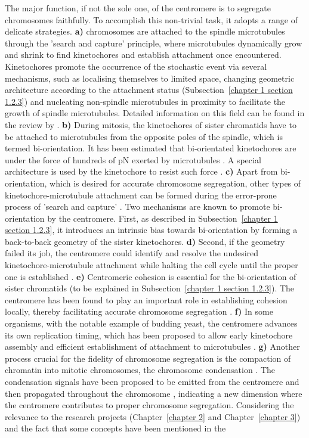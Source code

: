 The major function, if not the sole one, of the centromere is to segregate chromosomes faithfully. To accomplish this non-trivial task, it adopts a range of delicate strategies. \textbf{a)} chromosomes are attached to the spindle microtubules through the 'search and capture' principle, where microtubules dynamically grow and shrink to find kinetochores and establish attachment once encountered. Kinetochores promote the occurrence of the stochastic event via several mechanisms, such as localising themselves to limited space, changing geometric architecture according to the attachment status (Subsection~\ref{chapter 1 section 1.2.3}) and nucleating non-spindle microtubules in proximity to facilitate the growth of spindle microtubules. Detailed information on this field can be found in the review by \cite{Renda2021RoleMorphogenesis}. \textbf{b)} During mitosis, the kinetochores of sister chromatids have to be attached to microtubules from the opposite poles of the spindle, which is termed bi-orientation. It has been estimated that bi-orientated kinetochores are under the force of hundreds of \si{\pico\newton} exerted by microtubules \citep{Ye2016ChromosomeKinetochore}. A special architecture is used by the kinetochore to resist such force \citep{Suzuki2014TheStretch}. \textbf{c)} Apart from bi-orientation, which is desired for accurate chromosome segregation, other types of kinetochore-microtubule attachment can be formed during the error-prone process of 'search and capture' \citep{Tanaka2010Kinetochore-microtubuleBi-orientation}. Two mechanisms are known to promote bi-orientation by the centromere. First, as described in Subsection~\ref{chapter 1 section 1.2.3}, it introduces an intrinsic bias towards bi-orientation by forming a back-to-back geometry of the sister kinetochores. \textbf{d)} Second, if the geometry failed its job, the centromere could identify and resolve the undesired kinetochore-microtubule attachment while halting the cell cycle until the proper one is established \citep{Marston2015}. \textbf{e)} Centromeric cohesion is essential for the bi-orientation of sister chromatids (to be explained in Subsection~\ref{chapter 1 section 1.2.3}). The centromere has been found to play an important role in establishing cohesion locally, thereby facilitating accurate chromosome segregation \citep{Tanaka2013}. \textbf{f)} In some organisms, with the notable example of budding yeast, the centromere advances its own replication timing, which has been proposed to allow early kinetochore assembly and efficient establishment of attachment to microtubules \citep{Tanaka2013}. \textbf{g)} Another process crucial for the fidelity of chromosome segregation is the compaction of chromatin into mitotic chromosomes, the chromosome condensation \citep{Piskadlo2016NovelCondensation}. The condensation signals have been proposed to be emitted from the centromere and then propagated throughout the chromosome \citep{Leonard2015, Wilkins2014AMitosis, Kruitwagen2018, Hendzel1997Mitosis-specificCondensation, Oliveira2007CondensinChromosomes}, indicating a new dimension where the centromere contributes to proper chromosome segregation. Considering the relevance to the research projects (Chapter~\ref{chapter 2} and Chapter~\ref{chapter 3}) and the fact that some concepts have been mentioned in the 